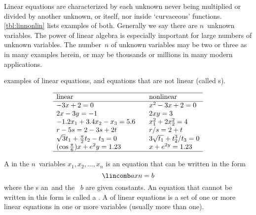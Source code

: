 Linear equations are characterized by each unknown never being multiplied or divided by another unknown, or itself, nor inside `curvaceous' functions.  
\cref{tbl:linnonlin} lists examples of both.
Generally we say there are \(n\)~unknown variables.
The power of linear algebra is especially important for large numbers of unknown variables.
The number~\(n\) of unknown variables may be two or three as in many examples herein, or may be thousands or millions in many modern applications.
\begin{table}
\caption{examples of linear equations, and equations that are not linear (called s).}
\label{tbl:linnonlin}
\begin{equation*}
\begin{array}{l@{\qquad}l}\hline
\text{linear}&\text{nonlinear}\\\hline
-3x+2=0 & x^2-3x+2=0 \\
2x-3y=-1 & 2xy=3\\
-1.2x_1+3.4x_2-x_3=5.6 & x_1^2+2x_2^2=4 \\
r-5s=2-3s+2t & r/s=2+t \\
\sqrt3t_1+\frac\pi2t_2-t_3=0 & 3\sqrt{t_1}+t_2^3/t_3=0\\
(\cos\frac\pi6)x+e^2y=1.23 & x+e^{2y}=1.23\\
\hline
\end{array}
\end{equation*}
\end{table}




\begin{definition} \label{def:lineqn} 
A  in the \(n\)~variables \(x_1,x_2,\ldots,x_n\) is an equation that can be written in the form
\begin{equation*}
\lincomb axn=b
\end{equation*}
where the s \hlist an\ and the ~\(b\) are given  constants.
An equation that cannot be written in this form is called a .
A  of linear equations is a set of one or more linear equations in one or more variables (usually more than one).
\end{definition}


